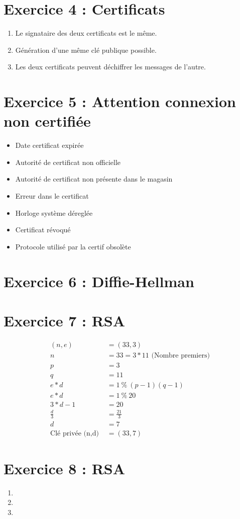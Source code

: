 \documentclass[11pt,a4paper]{article}
\begin{document}
	\section{Exercice 4 : Certificats}
	
	\begin{enumerate}
		\item Le signataire des deux certificats est le même.
		\item Génération d'une même clé publique possible.
		\item Les deux certificats peuvent déchiffrer les messages de l'autre.
	\end{enumerate}

	\section{Exercice 5 : Attention connexion non certifiée}
	
	\begin{itemize}
		\item Date certificat expirée
		\item Autorité de certificat non officielle
		\item Autorité de certificat non présente dans le magasin
		\item Erreur dans le certificat
		\item Horloge système déreglée
		\item Certificat révoqué
		\item Protocole utilisé par la certif obsolète
	\end{itemize}
	
	\section{Exercice 6 : Diffie-Hellman}
	
	\section{Exercice 7 : RSA}
	
	\begin{align*}
		(n,e) &= (33, 3)\\
		n &= 33 = 3 * 11 \text{ (Nombre premiers)}\\
		p &= 3\\
		q &= 11\\
		e * d &= 1\ \%\ (p-1)(q-1)\\
		e * d &= 1\ \%\ 20\\
		3 * d - 1 &= 20\\
		\frac{d}{3}&= \frac{21}{3}\\
		d &= 7\\
		\text{Clé privée (n,d) } &= (33, 7)
	\end{align*}

	\section{Exercice 8 : RSA}
	
	\begin{enumerate}
		\item 
		\item 
		\item 
	\end{enumerate}
\end{document}
